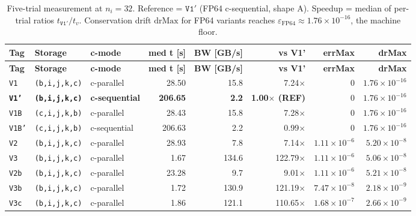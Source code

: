 \documentclass[11pt,a4paper]{article}
\begin{document}
{\scriptsize
\begin{longtable}{@{}lp{2.3cm}p{2.2cm}rrrrr@{}}
\caption{Five-trial measurement at \(n_i = 32\). Reference =
\(\mathtt{V1'}\) (FP64 c-sequential, shape A). Speedup = median of
per-trial ratios \(t_{\mathtt{V1'}}/t_v\). Conservation drift
\(\mathrm{drMax}\) for FP64 variants reaches
\(\varepsilon_{\mathrm{FP64}} \approx 1.76\!\times\!10^{-16}\), the
machine floor.} \label{tab:results} \\
\toprule
\textbf{Tag} & \textbf{Storage} & \textbf{c-mode} & \textbf{med t [s]} & \textbf{BW [GB/s]} & \textbf{vs V1'} & \textbf{errMax} & \textbf{drMax} \\
\midrule
\endfirsthead
\toprule
\textbf{Tag} & \textbf{Storage} & \textbf{c-mode} & \textbf{med t [s]} & \textbf{BW [GB/s]} & \textbf{vs V1'} & \textbf{errMax} & \textbf{drMax} \\
\midrule
\endhead
\texttt{V1} & \scriptsize\texttt{(b,i,j,k,c)} & c-parallel & 28.50 & 15.8 & 7.24\(\times\) & \(0\) & \(1.76{\times}10^{-16}\) \\
\textbf{\texttt{V1'}} & \scriptsize\textbf{\texttt{(b,i,j,k,c)}} & \textbf{c-sequential} & \textbf{206.65} & \textbf{2.2} & \textbf{1.00\(\times\) (REF)} & \textbf{\(0\)} & \textbf{\(1.76{\times}10^{-16}\)} \\
\texttt{V1B} & \scriptsize\texttt{(c,i,j,k,b)} & c-parallel & 28.43 & 15.8 & 7.28\(\times\) & \(0\) & \(1.76{\times}10^{-16}\) \\
\texttt{V1B'} & \scriptsize\texttt{(c,i,j,k,b)} & c-sequential & 206.63 & 2.2 & 0.99\(\times\) & \(0\) & \(1.76{\times}10^{-16}\) \\
\texttt{V2} & \scriptsize\texttt{(b,i,j,k,c)} & c-parallel & 28.93 & 7.8 & 7.14\(\times\) & \(1.11{\times}10^{-6}\) & \(5.20{\times}10^{-8}\) \\
\texttt{V3} & \scriptsize\texttt{(b,i,j,k,c)} & c-parallel & 1.67 & 134.6 & 122.79\(\times\) & \(1.11{\times}10^{-6}\) & \(5.06{\times}10^{-8}\) \\
\texttt{V2b} & \scriptsize\texttt{(b,i,j,k,c)} & c-parallel & 23.28 & 9.7 & 9.01\(\times\) & \(1.11{\times}10^{-6}\) & \(5.21{\times}10^{-8}\) \\
\texttt{V3b} & \scriptsize\texttt{(b,i,j,k,c)} & c-parallel & 1.72 & 130.9 & 121.19\(\times\) & \(7.47{\times}10^{-8}\) & \(2.18{\times}10^{-9}\) \\
\texttt{V3c} & \scriptsize\texttt{(b,i,j,k,c)} & c-parallel & 1.86 & 121.1 & 110.65\(\times\) & \(1.68{\times}10^{-7}\) & \(2.66{\times}10^{-9}\) \\

\end{longtable}}
\end{document}
